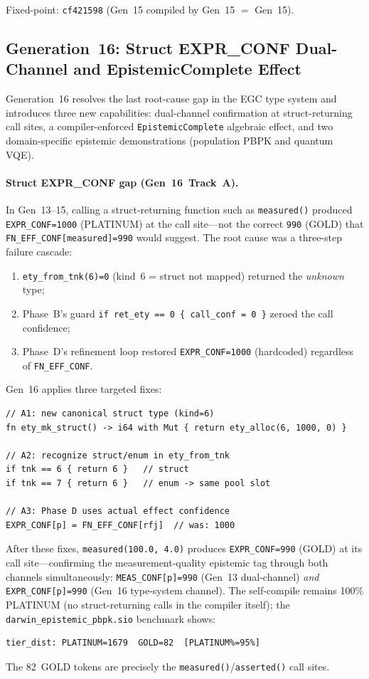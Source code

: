 \documentclass[acmsmall,screen,review,anonymous]{acmart}
\begin{document}
Fixed-point: \texttt{cf421598} (Gen~15 compiled by Gen~15 $=$ Gen~15).

\subsection{Generation~16: Struct EXPR\_CONF Dual-Channel and EpistemicComplete Effect}
\label{sec:gen16}

Generation~16 resolves the last root-cause gap in the EGC type system
and introduces three new capabilities: dual-channel confirmation at
struct-returning call sites, a compiler-enforced \texttt{EpistemicComplete}
algebraic effect, and two domain-specific epistemic demonstrations
(population PBPK and quantum VQE).

\paragraph{Struct EXPR\_CONF gap (Gen~16~Track~A).}
In Gen~13--15, calling a struct-returning function such as \texttt{measured()}
produced \texttt{EXPR\_CONF=1000} (PLATINUM) at the call site---not the
correct \texttt{990} (GOLD) that \texttt{FN\_EFF\_CONF[measured]=990} would
suggest.
The root cause was a three-step failure cascade:
\begin{enumerate}
  \item \texttt{ety\_from\_tnk(6)=0} (kind~6 = struct not mapped) returned
        the \emph{unknown} type;
  \item Phase~B's guard \texttt{if ret\_ety == 0 \{ call\_conf = 0 \}}
        zeroed the call confidence;
  \item Phase~D's refinement loop restored \texttt{EXPR\_CONF=1000}
        (hardcoded) regardless of \texttt{FN\_EFF\_CONF}.
\end{enumerate}
Gen~16 applies three targeted fixes:
\begin{verbatim}
// A1: new canonical struct type (kind=6)
fn ety_mk_struct() -> i64 with Mut { return ety_alloc(6, 1000, 0) }

// A2: recognize struct/enum in ety_from_tnk
if tnk == 6 { return 6 }   // struct
if tnk == 7 { return 6 }   // enum -> same pool slot

// A3: Phase D uses actual effect confidence
EXPR_CONF[p] = FN_EFF_CONF[rfj]  // was: 1000
\end{verbatim}
After these fixes, \texttt{measured(100.0, 4.0)} produces
\texttt{EXPR\_CONF=990} (GOLD) at its call site---confirming the
measurement-quality epistemic tag through both channels simultaneously:
\texttt{MEAS\_CONF[p]=990} (Gen~13 dual-channel) \emph{and}
\texttt{EXPR\_CONF[p]=990} (Gen~16 type-system channel).
The self-compile remains 100\% PLATINUM (no struct-returning calls in
the compiler itself); the \texttt{darwin\_epistemic\_pbpk.sio} benchmark
shows:
\begin{verbatim}
tier_dist: PLATINUM=1679  GOLD=82  [PLATINUM%=95%]
\end{verbatim}
The 82~GOLD tokens are precisely the \texttt{measured()}/\texttt{asserted()}
call sites.
\end{document}
